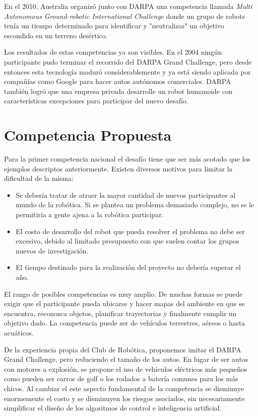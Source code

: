 \documentclass[a4paper,12pt]{article}
\begin{document}
En el 2010, Australia organizó junto con DARPA una competencia llamada \textit{Multi Autonomous Ground-robotic International Challenge} donde un grupo de robots tenía un tiempo determinado para identificar y "neutralizar" un objetivo escondido en un terreno desértico.

Los resultados de estas competencias ya son visibles. En el 2004 ningún participante pudo terminar el recorrido del DARPA Grand Challenge, pero desde entonces esta tecnología maduró considerablemente y ya está siendo aplicada por compañías como Google para hacer autos autónomos comerciales. DARPA también logró que una empresa privada desarrolle un robot humanoide con características excepciones para participar del nuevo desafío.

\section{Competencia Propuesta}

Para la primer competencia nacional el desafío tiene que ser más acotado que los ejemplos descriptos anteriormente. Existen diversos motivos para limitar la dificultad de la misma:
\begin{itemize}
 \item Se debería tratar de atraer la mayor cantidad de nuevos participantes al mundo de la robótica. Si se plantea un problema demasiado complejo, no se le permitiría a gente ajena a la robótica participar.
 \item El costo de desarrollo del robot que pueda resolver el problema no debe ser excesivo, debido al limitado presupuesto con que suelen contar los grupos nuevos de investigación.
 \item El tiempo destinado para la realización del proyecto no debería superar el año.
\end{itemize}

El rango de posibles competencias es muy amplio. De muchas formas se puede exigir que el participante pueda ubicarse y hacer mapas del ambiente en que se encuentra, reconozca objetos, planificar trayectorias y finalmente cumplir un objetivo dado. La competencia puede ser de vehículos terrestres, aéreos o hasta acuáticos.

De la experiencia propia del Club de Robótica, proponemos imitar el DARPA Grand Challenge, pero reduciendo el tamaño de los autos. En lugar de ser autos con motores a explosión, se propone el uso de vehículos eléctricos más pequeños como pueden ser carros de golf o los rodados a batería comunes para los más chicos. Al cambiar el este aspecto fundamental de la competencia se disminuye enormemente el costo y se disminuyen los riesgos asociados, sin necesariamente simplificar el diseño de los algoritmos de control e inteligencia artificial.
\end{document}
